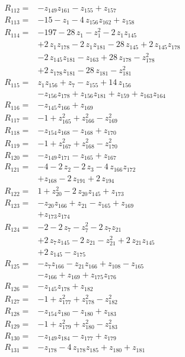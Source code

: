 \begin{align*}
R_{112}={}&-z_{149}z_{161} -z_{155} +z_{157}\\[2pt]
R_{113}={}&-15 -z_{1} -4\,z_{156}z_{162} +z_{158}\\[2pt]
R_{114}={}&-197 -28\,z_{1} -z_{1}^{2} -2\,z_{1}z_{145}\\
&+2\,z_{1}z_{178} -2\,z_{1}z_{181} -28\,z_{145} +2\,z_{145}z_{178}\\
&-2\,z_{145}z_{181} -z_{163} +28\,z_{178} -z_{178}^{2}\\
&+2\,z_{178}z_{181} -28\,z_{181} -z_{181}^{2}\\[2pt]
R_{115}={}&z_{1}z_{156} +z_{7} -z_{155} +14\,z_{156}\\
&-z_{156}z_{178} +z_{156}z_{181} +z_{159} +z_{163}z_{164}\\[2pt]
R_{116}={}&-z_{145}z_{166} +z_{169}\\[2pt]
R_{117}={}&-1 +z_{165}^{2} +z_{166}^{2} -z_{169}^{2}\\[2pt]
R_{118}={}&-z_{154}z_{168} -z_{168} +z_{170}\\[2pt]
R_{119}={}&-1 +z_{167}^{2} +z_{168}^{2} -z_{170}^{2}\\[2pt]
R_{120}={}&-z_{149}z_{171} -z_{165} +z_{167}\\[2pt]
R_{121}={}&-4 -2\,z_{2} -2\,z_{3} -4\,z_{166}z_{172}\\
&+z_{168} -2\,z_{191} +2\,z_{194}\\[2pt]
R_{122}={}&1 +z_{20}^{2} -2\,z_{20}z_{145} +z_{173}\\[2pt]
R_{123}={}&-z_{20}z_{166} +z_{21} -z_{165} +z_{169}\\
&+z_{173}z_{174}\\[2pt]
R_{124}={}&-2 -2\,z_{7} -z_{7}^{2} -2\,z_{7}z_{21}\\
&+2\,z_{7}z_{145} -2\,z_{21} -z_{21}^{2} +2\,z_{21}z_{145}\\
&+2\,z_{145} -z_{175}\\[2pt]
R_{125}={}&-z_{7}z_{166} -z_{21}z_{166} +z_{108} -z_{165}\\
&-z_{166} +z_{169} +z_{175}z_{176}\\[2pt]
R_{126}={}&-z_{145}z_{178} +z_{182}\\[2pt]
R_{127}={}&-1 +z_{177}^{2} +z_{178}^{2} -z_{182}^{2}\\[2pt]
R_{128}={}&-z_{154}z_{180} -z_{180} +z_{183}\\[2pt]
R_{129}={}&-1 +z_{179}^{2} +z_{180}^{2} -z_{183}^{2}\\[2pt]
R_{130}={}&-z_{149}z_{184} -z_{177} +z_{179}\\[2pt]
R_{131}={}&-z_{178} -4\,z_{178}z_{185} +z_{180} +z_{181}\\[2pt]

\end{align*}
